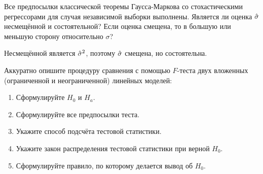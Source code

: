 \begin{problem}
Все предпосылки классической теоремы Гаусса-Маркова со стохастическими регрессорами для случая независимой выборки выполнены. Является ли оценка $\hat{\sigma}$ несмещённой и состоятельной? Если оценка смещена, то в большую или меньшую сторону относительно $\sigma$?


\begin{sol}
Несмещённой является $\hat{\sigma}^2$, поэтому $\hat{\sigma}$ смещена, но состоятельна.
\end{sol}
\end{problem}

\begin{problem}
Аккуратно опишите процедуру сравнения с помощью $F$-теста двух вложенных (ограниченной и неограниченной) линейных моделей:
\begin{enumerate}
\item Сформулируйте $H_0$ и $H_a$.
\item Сформулируйте все предпосылки теста.
\item Укажите способ подсчёта тестовой статистики.
\item Укажите закон распределения тестовой статистики при верной $H_0$.
\item Сформулируйте правило, по которому делается вывод об $H_0$.
\end{enumerate}

\begin{sol}
\end{sol}
\end{problem}

